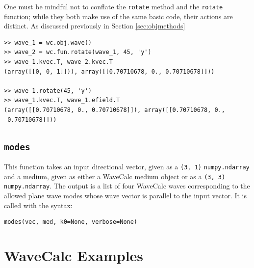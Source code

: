 \documentclass[11pt, reqno]{book}%
\newcounter{ct}
\newcommand{\tw}[1]{{\tt #1}}
\begin{document}
One must be mindful not to conflate the \tw{rotate} method and the \tw{rotate} function; while they both make use of the same basic code, their actions are distinct. As discussed previously in Section \ref{sec:objmethods}
\begin{verbatim}
>> wave_1 = wc.obj.wave()
>> wave_2 = wc.fun.rotate(wave_1, 45, 'y')
>> wave_1.kvec.T, wave_2.kvec.T
(array([[0, 0, 1]])), array([[0.70710678, 0., 0.70710678]]))

>> wave_1.rotate(45, 'y')
>> wave_1.kvec.T, wave_1.efield.T
(array([[0.70710678, 0., 0.70710678]]), array([[0.70710678, 0., -0.70710678]]))
\end{verbatim}















\section{\tw{modes}}
\label{sec:modes}

This function takes an input directional vector, given as a \tw{(3, 1)} \tw{numpy.ndarray} and a medium, given as either a WaveCalc medium object or as a \tw{(3, 3)} \tw{numpy.ndarray}. The output is a list of four WaveCalc waves corresponding to the allowed plane wave modes whose wave vector is parallel to the input vector. It is called with the syntax:
\begin{verbatim}
modes(vec, med, k0=None, verbose=None)
\end{verbatim}

















\chapter{WaveCalc Examples}
\label{chap:examp}
\end{document}
